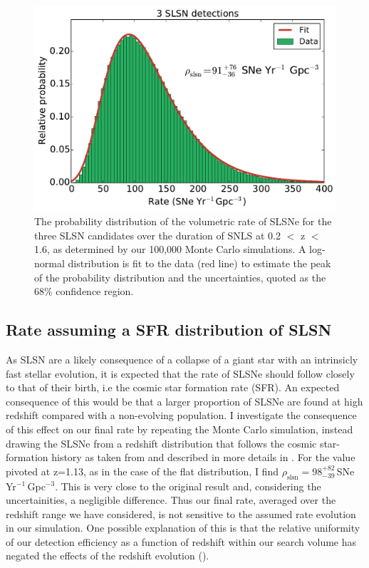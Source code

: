 \begin{figure}
\includegraphics[scale=0.5]{Figures/Chapter3/rateFlat3}
\caption{The probability distribution of the volumetric rate of SLSNe for the three SLSN candidates over the duration of SNLS at 0.2 $<$ z $<$ 1.6, as determined by our 100,000 Monte Carlo simulations. A log-normal distribution is fit to the data (red line) to estimate the peak of the probability distribution and the uncertainties, quoted as the 68\% confidence region.}
\label{fig:rateFlat3}
\end{figure}

\subsection{Rate assuming a SFR distribution of SLSN}
\label{sec:SFRRate}
As SLSN are a likely consequence of a collapse of a giant star with an intrinsicly fast stellar evolution, it is expected that the rate of SLSNe should follow closely to that of their birth, i.e the cosmic star formation rate (SFR). An expected consequence of this would be that a larger proportion of SLSNe are found at high redshift compared with a non-evolving population. I investigate the consequence of this effect on our final rate by repeating the Monte Carlo simulation, instead drawing the SLSNe from a redshift distribution that follows the cosmic star-formation history as taken from \citet{2006ApJ...651..142H} and described in more details in . For the value pivoted at z=1.13, as in the case of the flat distribution, I find $\rho_{\mathrm{slsn}} = 98^{+82}_{-39}$\,SNe\,Yr$^{-1}$\,Gpc$^{-3}$. This is very close to the original result and, considering the uncertainities, a negligible difference. Thus our final rate, averaged over the redshift range we have considered, is not sensitive to the assumed rate evolution in our simulation. One possible explanation of this is that the relative uniformity of our detection efficiency as a function of redshift within our search volume has negated the effects of the redshift evolution ().
